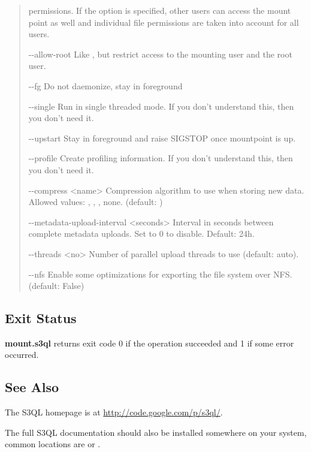 \documentclass[letterpaper,10pt,english]{sphinxmanual}
\begin{document}
\begin{quote}
\begin{optionlist}{3cm}
permissions. If the  option is
specified, other users can access the mount point as
well and individual file permissions are taken into
account for all users.
\item [-{-}allow-root]  
Like , but restrict access to the
mounting user and the root user.
\item [-{-}fg]  
Do not daemonize, stay in foreground
\item [-{-}single]  
Run in single threaded mode. If you don't understand
this, then you don't need it.
\item [-{-}upstart]  
Stay in foreground and raise SIGSTOP once mountpoint
is up.
\item [-{-}profile]  
Create profiling information. If you don't understand
this, then you don't need it.
\item [-{-}compress \textless{}name\textgreater{}]  
Compression algorithm to use when storing new data.
Allowed values: , , , none.
(default: )
\item [-{-}metadata-upload-interval \textless{}seconds\textgreater{}]  
Interval in seconds between complete metadata uploads.
Set to 0 to disable. Default: 24h.
\item [-{-}threads \textless{}no\textgreater{}]  
Number of parallel upload threads to use (default:
auto).
\item [-{-}nfs]  
Enable some optimizations for exporting the file
system over NFS. (default: False)
\end{optionlist}
\end{quote}


\subsection{Exit Status}
\label{man/mount:exit-status}
\textbf{mount.s3ql} returns exit code 0 if the operation succeeded and 1 if some
error occurred.


\subsection{See Also}
\label{man/mount:see-also}
The S3QL homepage is at \href{http://code.google.com/p/s3ql/}{http://code.google.com/p/s3ql/}.

The full S3QL documentation should also be installed somewhere on your
system, common locations are  or
.
\end{document}
